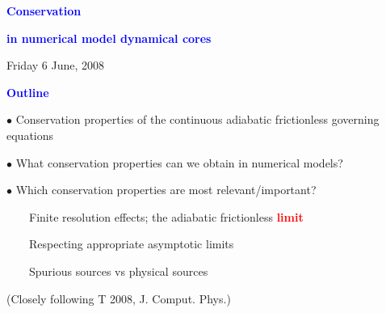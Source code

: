 \documentclass[a4]{seminar}
\newcommand{\R}[1]{\textcolor{red}{#1}}
\newcommand{\B}[1]{\textcolor{blue}{#1}}
\begin{document}

\pagestyle{fancy}



\begin{slide}

\begin{center}

{\Large \bf
\B{Conservation}
}

\B{\bf in numerical model dynamical cores}

\end{center}

\vspace{6mm}

\begin{center}
{\small Friday 6 June, 2008}
\end{center}

\end{slide}


\begin{slide}


\B{\bf Outline}

\vspace{4mm}

\(\bullet\) Conservation properties of the continuous
adiabatic frictionless governing equations

\(\bullet\) What conservation properties can we obtain in numerical models?

\(\bullet\) Which conservation properties are most relevant/important?

\ \ \ \ Finite resolution effects; the adiabatic frictionless \R{\bf limit}

\ \ \ \ Respecting appropriate asymptotic limits

\ \ \ \ Spurious sources vs physical sources

\vspace{4mm}

(Closely following T 2008, J. Comput. Phys.)

\end{slide}

\end{document}
